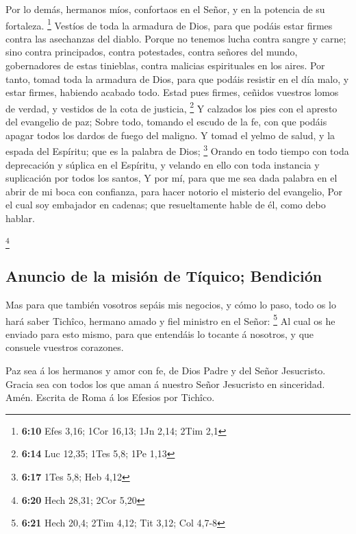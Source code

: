 Por lo demás, hermanos míos, confortaos en el Señor, y en
la potencia de su fortaleza. \footnote{\textbf{6:10} Efes 3,16; 1Cor
  16,13; 1Jn 2,14; 2Tim 2,1}  Vestíos de toda la armadura
de Dios, para que podáis estar firmes contra las asechanzas del diablo.
 Porque no tenemos lucha contra sangre y carne; sino contra
principados, contra potestades, contra señores del mundo, gobernadores
de estas tinieblas, contra malicias espirituales en los aires.
 Por tanto, tomad toda la armadura de Dios, para que podáis
resistir en el día malo, y estar firmes, habiendo acabado todo.
 Estad pues firmes, ceñidos vuestros lomos de verdad, y
vestidos de la cota de justicia, \footnote{\textbf{6:14} Luc 12,35; 1Tes
  5,8; 1Pe 1,13}  Y calzados los pies con el apresto del
evangelio de paz;  Sobre todo, tomando el escudo de la fe,
con que podáis apagar todos los dardos de fuego del maligno.
 Y tomad el yelmo de salud, y la espada del Espíritu; que
es la palabra de Dios; \footnote{\textbf{6:17} 1Tes 5,8; Heb 4,12}
 Orando en todo tiempo con toda deprecación y súplica en el
Espíritu, y velando en ello con toda instancia y suplicación por todos
los santos,  Y por mí, para que me sea dada palabra en el
abrir de mi boca con confianza, para hacer notorio el misterio del
evangelio,  Por el cual soy embajador en cadenas; que
resueltamente hable de él, como debo hablar.

\footnote{\textbf{6:20} Hech 28,31; 2Cor 5,20}

\hypertarget{anuncio-de-la-misiuxf3n-de-tuxedquico-bendiciuxf3n}{%
\subsection{Anuncio de la misión de Tíquico;
Bendición}\label{anuncio-de-la-misiuxf3n-de-tuxedquico-bendiciuxf3n}}

 Mas para que también vosotros sepáis mis negocios, y cómo
lo paso, todo os lo hará saber Tichîco, hermano amado y fiel ministro en
el Señor: \footnote{\textbf{6:21} Hech 20,4; 2Tim 4,12; Tit 3,12; Col
  4,7-8}  Al cual os he enviado para esto mismo, para que
entendáis lo tocante á nosotros, y que consuele vuestros corazones.

 Paz sea á los hermanos y amor con fe, de Dios Padre y del
Señor Jesucristo.  Gracia sea con todos los que aman á
nuestro Señor Jesucristo en sinceridad. Amén. Escrita de Roma á los
Efesios por Tichîco.
